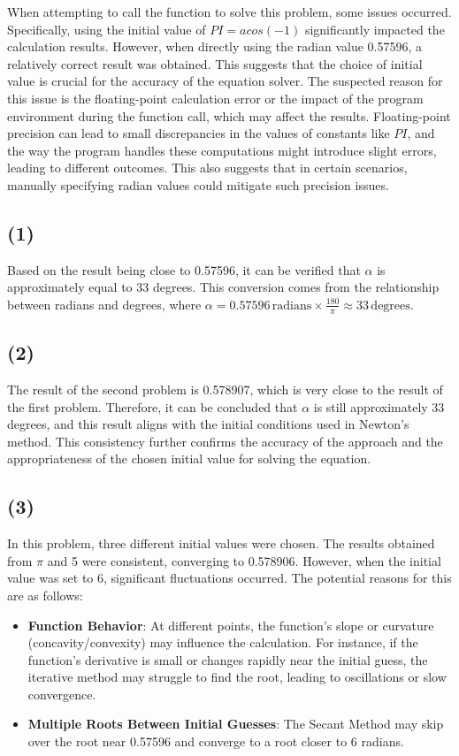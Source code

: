 \documentclass[a4paper]{article}
\begin{document}
When attempting to call the function to solve this problem, some issues occurred. 
Specifically, using the initial value of \( PI = acos(-1) \) significantly impacted the calculation results. 
However, when directly using the radian value 0.57596, a relatively correct result was obtained. 
This suggests that the choice of initial value is crucial for the accuracy of the equation solver.
The suspected reason for this issue is the floating-point calculation error or the impact of the program environment during the function call, which may affect the results. 
Floating-point precision can lead to small discrepancies in the values of constants like \( PI \), and the way the program handles these computations might introduce slight errors, leading to different outcomes. 
This also suggests that in certain scenarios, manually specifying radian values could mitigate such precision issues.

\subsection*{(1)}
Based on the result being close to 0.57596, it can be verified that \(\alpha\) is approximately equal to 33 degrees. This conversion comes from the relationship between radians and degrees, where \( \alpha = 0.57596 \, \text{radians} \times \frac{180}{\pi} \approx 33 \, \text{degrees} \).

\subsection*{(2)}
The result of the second problem is 0.578907, which is very close to the result of the first problem. Therefore, it can be concluded that \(\alpha\) is still approximately 33 degrees, and this result aligns with the initial conditions used in Newton's method. This consistency further confirms the accuracy of the approach and the appropriateness of the chosen initial value for solving the equation.

\subsection*{(3)}
In this problem, three different initial values were chosen. The results obtained from \( \pi \) and 5 were consistent, converging to 0.578906. However, when the initial value was set to 6, significant fluctuations occurred. The potential reasons for this are as follows:
\begin{itemize}
    \item \textbf{Function Behavior}: At different points, the function's slope or curvature (concavity/convexity) may influence the calculation. For instance, if the function's derivative is small or changes rapidly near the initial guess, the iterative method may struggle to find the root, leading to oscillations or slow convergence.
    \item \textbf{Multiple Roots Between Initial Guesses}:
    The Secant Method may skip over the root near 0.57596 and converge to a root closer to 6 radians.
\end{itemize}
\end{document}

